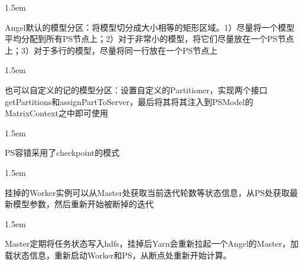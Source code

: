 \documentclass{article}
\begin{document}
\begin{mddefinitions}%


\begin{mdbmarginx}{}{}{}{1.5em}%
\begin{mddefdata}%
Angel默认的模型分区：将模型切分成大小相等的矩形区域。1）尽量将一个模型平均分配到所有PS节点上；2）对于非常小的模型，将它们尽量放在一个PS节点上；3）对于多行的模型，尽量将同一行放在一个PS节点上
\end{mddefdata}%
\end{mdbmarginx}%

\begin{mdbmarginx}{}{}{}{1.5em}%
\begin{mddefdata}%
也可以自定义的记的模型分区：设置自定义的Partitioner，实现两个接口getPartitions和assignPartToServer，最后将其将其注入到PSModel的MatrixContext之中即可使用
\end{mddefdata}%
\end{mdbmarginx}%


\begin{mdbmarginx}{}{}{}{1.5em}%
\begin{mddefdata}%
PS容错采用了checkpoint的模式
\end{mddefdata}%
\end{mdbmarginx}%

\begin{mdbmarginx}{}{}{}{1.5em}%
\begin{mddefdata}%
挂掉的Worker实例可以从Master处获取当前迭代轮数等状态信息，从PS处获取最新模型参数，然后重新开始被断掉的迭代
\end{mddefdata}%
\end{mdbmarginx}%

\begin{mdbmarginx}{}{}{}{1.5em}%
\begin{mddefdata}%
Master定期将任务状态写入hdfs，挂掉后Yarn会重新拉起一个Angel的Master，加载状态信息，重新启动Worker和PS，从断点处重新开始计算。%
\end{mddefdata}%
\end{mdbmarginx}%
\end{mddefinitions}%
\end{document}
